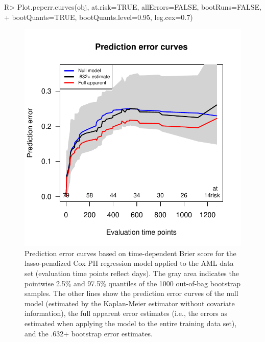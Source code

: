 \documentclass[]{jss}
\begin{document}
\begin{Schunk}
\begin{Sinput}
R> Plot.peperr.curves(obj, at.risk=TRUE, allErrors=FALSE, bootRuns=FALSE,
+                     bootQuants=TRUE, bootQuants.level=0.95, leg.cex=0.7)
\end{Sinput}
\end{Schunk}
\begin{figure}[t!]
\begin{center}
\includegraphics{c060_vignette-peperrPlot2}
\end{center}
\caption{Prediction error curves based on time-dependent Brier score for the lasso-penalized Cox PH regression model applied to the AML data set (evaluation time points reflect days). The gray area indicates the pointwise 2.5\% and 97.5\% quantiles of the 1000 out-of-bag bootstrap samples. The other lines show the prediction error curves of the null model (estimated by the Kaplan-Meier estimator without covariate information), the full apparent error estimates (i.e., the errors as estimated when applying the model to the entire training data set), and the .632+ bootstrap error estimates.}
\label{fig:pec}
\end{figure}
\end{document}
